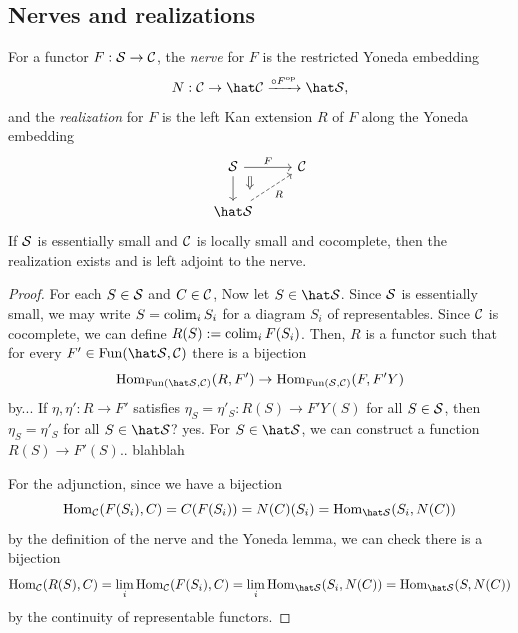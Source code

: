 \documentclass{../../../small}
\begin{document}
\subsection{Nerves and realizations}

\begin{proposition}
For a functor $F:\mathcal{S}\to\mathcal{C}$, the \emph{nerve} for $F$ is the restricted Yoneda embedding
\[N:\cC\to\hat\cC\xrightarrow{\circ F^\op}\hat\cS,\]
and the \emph{realization} for $F$ is the left Kan extension $R$ of $F$ along the Yoneda embedding
\[\begin{tikzcd}
\cS\rar{F}\dar\dar[shift left=5,Rightarrow,shorten >= 8]&\cC\\
\hat\cS\ar[swap,dashed]{ur}{R}
\end{tikzcd}\]
If $\mathcal{S}$ is essentially small and $\mathcal{C}$ is locally small and cocomplete, then the realization exists and is left adjoint to the nerve.
\end{proposition}
\begin{proof}
For each $S\in\mathcal{S}$ and $C\in\mathcal{C}$, 
Now let $S\in\hat\cS$.
Since $\mathcal{S}$ is essentially small, we may write $S=\operatorname*{colim}_iS_i$ for a diagram $S_i$ of representables.
Since $\mathcal{C}$ is cocomplete, we can define $R(S):=\operatorname*{colim}_iF(S_i)$.
Then, $R$ is a functor such that for every $F'\in\Fun(\hat\cS,\cC)$ there is a bijection
\[\Hom_{\Fun(\hat\cS,\cC)}(R,F')\to\Hom_{\Fun(\cS,\cC)}(F,F'Y)\]
by...
If $\eta,\eta':R\to F'$ satisfies $\eta_S=\eta'_S:R(S)\to F'Y(S)$ for all $S\in\mathcal{S}$, then $\eta_S=\eta'_S$ for all $S\in\hat\cS$? yes.
For $S\in\hat\cS$, we can construct a function $R(S)\to F'(S)$.. blahblah

For the adjunction, since we have a bijection
\[\Hom_\cC(F(S_i),C)=C(F(S_i))=N(C)(S_i)=\Hom_{\hat\cS}(S_i,N(C))\]
by the definition of the nerve and the Yoneda lemma, we can check there is a bijection
\[\Hom_\cC(R(S),C)=\lim_i\Hom_\cC(F(S_i),C)=\lim_i\Hom_{\hat\cS}(S_i,N(C))=\Hom_{\hat\cS}(S,N(C))\]
by the continuity of representable functors.
\end{proof}
\end{document}
